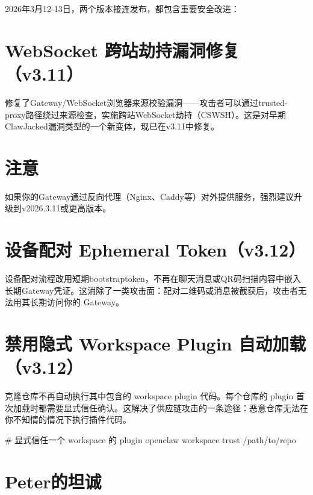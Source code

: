 \documentclass[
  10
]{article}
\newenvironment{Shaded}{}{}
\newcommand{\NormalTok}[1]{#1}
\begin{document}
2026年3月12-13日，两个版本接连发布，都包含重要安全改进：

\section{WebSocket
跨站劫持漏洞修复（v3.11）}\label{websocket-ux8de8ux7ad9ux52abux6301ux6f0fux6d1eux4feeux590dv3.11}

修复了Gateway/WebSocket浏览器来源校验漏洞------攻击者可以通过trusted-proxy路径绕过来源检查，实施跨站WebSocket劫持（CSWSH）。这是对早期ClawJacked漏洞类型的一个新变体，现已在v3.11中修复。

\section{注意}\label{ux6ce8ux610f-22}

如果你的Gateway通过反向代理（Nginx、Caddy等）对外提供服务，强烈建议升级到v2026.3.11或更高版本。

\section{设备配对 Ephemeral
Token（v3.12）}\label{ux8bbeux5907ux914dux5bf9-ephemeral-tokenv3.12}

设备配对流程改用短期bootstraptoken，不再在聊天消息或QR码扫描内容中嵌入长期Gateway凭证。这消除了一类攻击面：配对二维码或消息被截获后，攻击者无法用其长期访问你的
Gateway。

\section{禁用隐式 Workspace Plugin
自动加载（v3.12）}\label{ux7981ux7528ux9690ux5f0f-workspace-plugin-ux81eaux52a8ux52a0ux8f7dv3.12}

克隆仓库不再自动执行其中包含的 workspace plugin 代码。每个仓库的 plugin
首次加载时都需要显式信任确认。这解决了供应链攻击的一条途径：恶意仓库无法在你不知情的情况下执行插件代码。

\begin{Shaded}
\begin{Highlighting}[]
\NormalTok{\# 显式信任一个 workspace 的 plugin}
\NormalTok{openclaw workspace trust /path/to/repo}
\end{Highlighting}
\end{Shaded}

\section{Peter的坦诚}\label{peterux7684ux5766ux8bda}
\end{document}
